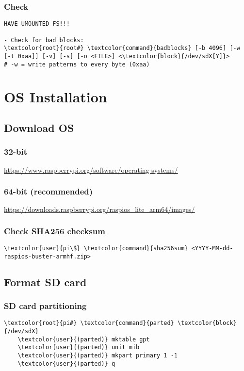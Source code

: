 \documentclass[10pt, a4paper, onecolumn, openany]{book} %
\begin{document}
\subsection{Check}
\begin{Verbatim}[commandchars=\\\{\}]
HAVE UMOUNTED FS!!!

- Check for bad blocks:
\textcolor{root}{root#} \textcolor{command}{badblocks} [-b 4096] [-w [-t 0xaa]] [-v] [-s] [-o <FILE>] <\textcolor{block}{/dev/sdX[Y]}>
# -w = write patterns to every byte (0xaa)
\end{Verbatim}

\chapter{OS Installation}
\section{Download OS}
\subsection{32-bit}
\underline{\url{https://www.raspberrypi.org/software/operating-systems/}}\newline
\subsection{64-bit (recommended)}
\underline{\url{https://downloads.raspberrypi.org/raspios_lite_arm64/images/}}
\subsection{Check SHA256 checksum}
\begin{Verbatim}[commandchars=\\\{\}]
    \textcolor{user}{pi\$} \textcolor{command}{sha256sum} <YYYY-MM-dd-raspios-buster-armhf.zip>
\end{Verbatim}
\section{Format SD card}
\subsection{SD card partitioning}
\begin{Verbatim}[commandchars=\\\{\}]
    \textcolor{root}{pi#} \textcolor{command}{parted} \textcolor{block}{/dev/sdX}
    \textcolor{user}{(parted)} mktable gpt
    \textcolor{user}{(parted)} unit mib
    \textcolor{user}{(parted)} mkpart primary 1 -1
    \textcolor{user}{(parted)} q
\end{Verbatim}
\end{document}
